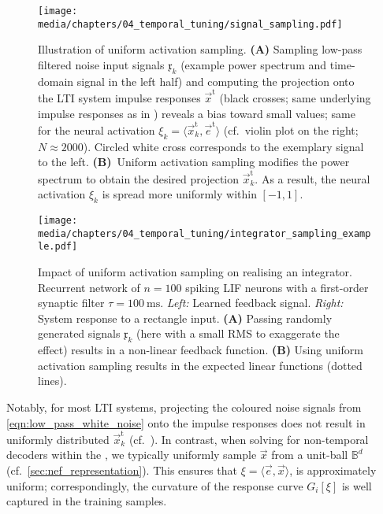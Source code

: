 \begin{figure}
	\centering
	\texttt{[image: media/chapters/04\_temporal\_tuning/signal\_sampling.pdf]}%
	{\label{fig:signal_sampling_a}}%
	{\label{fig:signal_sampling_b}}%
	\caption[Illustration of uniform activation sampling]{Illustration of uniform activation sampling.
	\textbf{(A)} Sampling low-pass filtered noise input signals $\mathfrak{x}_k$ (example power spectrum and time-domain signal in the left half) and computing the projection onto the LTI system impulse responses $\vec{x}^\mathrm{t}$ (black crosses; same underlying impulse responses as in ) reveals a bias toward small values; same for the neural activation $\xi_k = \langle \vec{x}^\mathrm{t}_k, \vec{e}^\mathrm{t} \rangle$ (cf.~violin plot on the right; $N \approx 2000$).
	Circled white cross corresponds to the exemplary signal to the left.
	\textbf{(B)}~Uniform activation sampling modifies the power spectrum to obtain the desired projection $\vec{x}^\mathrm{t}_k$.
	As a result, the neural activation $\xi_k$ is spread more uniformly within $[-1, 1]$.
	}
	\label{fig:signal_sampling}
\end{figure}

\begin{figure}
	\centering
	\texttt{[image: media/chapters/04\_temporal\_tuning/integrator\_sampling\_example.pdf]}%
	\caption[Impact of uniform activation sampling on realising an integrator]{
	Impact of uniform activation sampling on realising an integrator.
	Recurrent network of $n = 100$ spiking LIF neurons with a first-order synaptic filter $\tau = \SI{100}{\milli\second}$.
	\emph{Left:} Learned feedback signal.
	\emph{Right:} System response to a rectangle input.
	\textbf{(A)} Passing randomly generated signals $\mathfrak{x}_k$ (here with a small RMS to exaggerate the effect) results in a non-linear feedback function.
	\textbf{(B)} Using uniform activation sampling results in the expected linear functions (dotted lines).
	}
	\label{fig:signal_sampling_weights}
\end{figure}

Notably, for most LTI systems, projecting the coloured noise signals from \cref{eqn:low_pass_white_noise} onto the impulse responses does not result in uniformly distributed $\vec x^\mathrm{t}_k$ (cf.~).
In contrast, when solving for non-temporal decoders within the \NEF, we typically uniformly sample $\vec x$ from a unit-ball $\mathbb{B}^d$ (cf.~\cref{sec:nef_representation}).
This ensures that $\xi = \langle \vec e, \vec x \rangle$, is approximately uniform; correspondingly, the curvature of the response curve $G_i[\xi]$ is well captured in the training samples.

